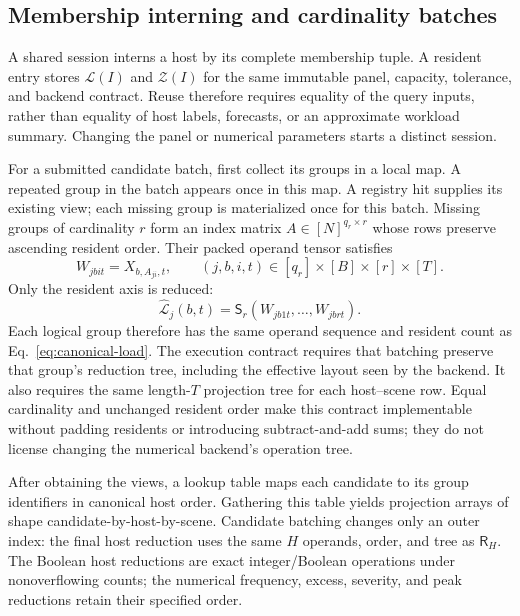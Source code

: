 \documentclass[11pt]{article}
\begin{document}
\subsection{Membership interning and cardinality batches}
A shared session interns a host by its complete membership tuple. A resident entry stores $\mathcal L(I)$ and $\mathcal Z(I)$ for the same immutable panel, capacity, tolerance, and backend contract. Reuse therefore requires equality of the query inputs, rather than equality of host labels, forecasts, or an approximate workload summary. Changing the panel or numerical parameters starts a distinct session.

For a submitted candidate batch, first collect its groups in a local map. A repeated group in the batch appears once in this map. A registry hit supplies its existing view; each missing group is materialized once for this batch. Missing groups of cardinality $r$ form an index matrix $A\in[N]^{q_r\times r}$ whose rows preserve ascending resident order. Their packed operand tensor satisfies
\begin{equation}
 W_{jbit}=X_{b,A_{ji},t},\qquad (j,b,i,t)\in[q_r]\times[B]\times[r]\times[T].
\end{equation}
Only the resident axis is reduced:
\begin{equation}
 \widehat{\mathcal L}_j(b,t)=\mathsf S_r(W_{jb1t},\ldots,W_{jbrt}).
\end{equation}
Each logical group therefore has the same operand sequence and resident count as Eq.~\eqref{eq:canonical-load}. The execution contract requires that batching preserve that group's reduction tree, including the effective layout seen by the backend. It also requires the same length-$T$ projection tree for each host--scene row. Equal cardinality and unchanged resident order make this contract implementable without padding residents or introducing subtract-and-add sums; they do not license changing the numerical backend's operation tree.

After obtaining the views, a lookup table maps each candidate to its group identifiers in canonical host order. Gathering this table yields projection arrays of shape candidate-by-host-by-scene. Candidate batching changes only an outer index: the final host reduction uses the same $H$ operands, order, and tree as $\mathsf R_H$. The Boolean host reductions are exact integer/Boolean operations under nonoverflowing counts; the numerical frequency, excess, severity, and peak reductions retain their specified order.
\end{document}

